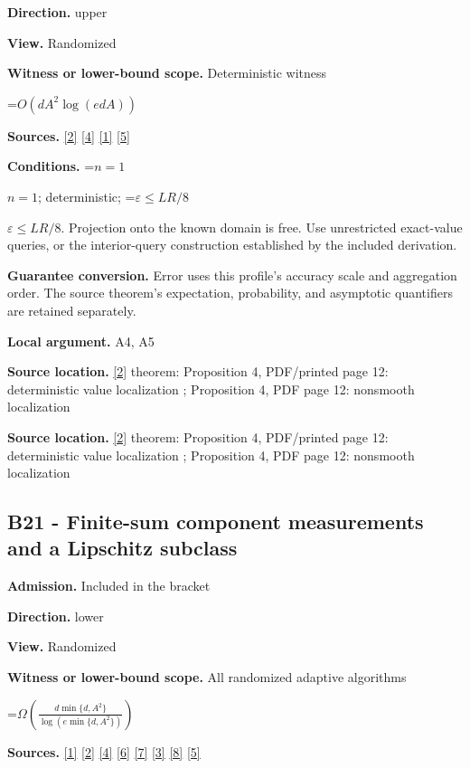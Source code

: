 \documentclass[10pt,a4paper]{article}
\newcommand{\AtlasMath}[1]{\par\begingroup\centering\setbox0=\hbox{$\displaystyle #1$}\ifdim\wd0>1.4\linewidth\typeout{ATLAS WIDE FORMULA: \the\wd0}\fi\ifdim\wd0>\linewidth\resizebox{\linewidth}{!}{\box0}\else\box0\fi\par\endgroup}
\newcommand{\AtlasInlineMath}[1]{\begingroup\setbox0=\hbox{$#1$}\ifdim\wd0>.4\linewidth\endgroup\AtlasMath{#1}\else\endgroup$#1$\fi}
\begin{document}
\textbf{Direction.} upper

\textbf{View.} Randomized

\textbf{Witness or lower-bound scope.} Deterministic witness

\AtlasMath{O\!\left(dA^2\log(edA)\right)}
\textbf{Sources.} \href{https://arxiv.org/html/2607.16558v2}{[2]} \href{https://www.mathnet.ru/php/archive.phtml?jrnid=mzm&option_lang=eng&paperid=1697&wshow=paper}{[4]} \href{https://arxiv.org/html/2610.00345v1}{[1]} \href{https://arxiv.org/abs/2109.08858}{[5]}

\textbf{Conditions.} \AtlasInlineMath{n=1}; deterministic; \AtlasInlineMath{\varepsilon\le LR/8}. Projection onto the known domain is free. Use unrestricted exact-value queries, or the interior-query construction established by the included derivation.

\textbf{Guarantee conversion.} Error uses this profile's accuracy scale and aggregation order. The source theorem's expectation, probability, and asymptotic quantifiers are retained separately.

\textbf{Local argument.} A4, A5

\textbf{Source location.} \href{https://arxiv.org/html/2607.16558v2}{[2]} theorem: Proposition 4, PDF/printed page 12: deterministic value localization ; Proposition 4, PDF page 12: nonsmooth localization

\textbf{Source location.} \href{https://arxiv.org/html/2607.16558v2}{[2]} theorem: Proposition 4, PDF/printed page 12: deterministic value localization ; Proposition 4, PDF page 12: nonsmooth localization

\subsection{B21 - Finite-sum component measurements and a Lipschitz subclass}
\textbf{Admission.} Included in the bracket

\textbf{Direction.} lower

\textbf{View.} Randomized

\textbf{Witness or lower-bound scope.} All randomized adaptive algorithms

\AtlasMath{\Omega\!\left(\frac{d\min\{d,A^2\}}{\log(e\min\{d,A^2\})}\right)}
\textbf{Sources.} \href{https://arxiv.org/html/2610.00345v1}{[1]} \href{https://arxiv.org/html/2607.16558v2}{[2]} \href{https://www.mathnet.ru/php/archive.phtml?jrnid=mzm&option_lang=eng&paperid=1697&wshow=paper}{[4]} \href{https://arxiv.org/abs/1802.09022}{[6]} \href{https://proceedings.neurips.cc/paper_files/paper/2022/file/329ef22fd8cb68223d5df09a037f7dd9-Paper-Conference.pdf}{[7]} \href{https://jmlr.org/papers/volume18/16-632/16-632.pdf}{[3]} \href{https://arxiv.org/pdf/1707.08486v2}{[8]} \href{https://arxiv.org/abs/2109.08858}{[5]}
\end{document}

